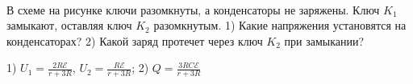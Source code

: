 \begin{ex} 
\hspace{0pt} \\
\begin{minipage}{.65\textwidth}
В схеме на рисунке ключи разомкнуты, а конденсаторы не заряжены. Ключ $K_1$ замыкают, оставляя ключ $K_2$ разомкнутым. 
1) Какие напряжения установятся на конденсаторах? 2) Какой заряд протечет через ключ $K_2$ при замыкании?
\end{minipage}
\begin{minipage}{.35\textwidth}
\centering

\end{minipage}
\begin{ans}
1) $U_1 = \frac{2R \mathcal{E}}{r+3R}$, $U_2 = \frac{R \mathcal{E}}{r+3R}$; 2) $Q=\frac{3RC\mathcal{E}}{r+3R}$
\end{ans}
\end{ex}